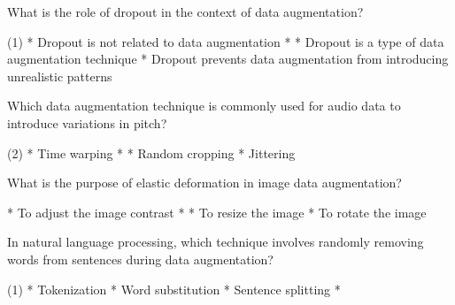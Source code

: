 \documentclass[10pt]{extarticle}
\begin{document}
\begin{exercise}
    What is the role of dropout in the context of data augmentation?
    \begin{choice} (1)
        * Dropout is not related to data augmentation
        * 
        * Dropout is a type of data augmentation technique
        * Dropout prevents data augmentation from introducing unrealistic patterns
    \end{choice}
\end{exercise}
\begin{solution}
\end{solution}

\begin{exercise}
    Which data augmentation technique is commonly used for audio data to introduce variations in pitch?
    \begin{choice} (2)
        * Time warping
        * 
        * Random cropping
        * Jittering
    \end{choice}
\end{exercise}
\begin{solution}
\end{solution}

\begin{exercise}
    What is the purpose of elastic deformation in image data augmentation?
    \begin{choice}
        * To adjust the image contrast
        * 
        * To resize the image
        * To rotate the image
    \end{choice}
\end{exercise}
\begin{solution}
\end{solution}

\begin{exercise}
    In natural language processing, which technique involves randomly removing words from sentences during data augmentation?
    \begin{choice} (1)
        * Tokenization
        * Word substitution
        * Sentence splitting
        * 
    \end{choice}
\end{exercise}
\begin{solution}
\end{solution}
\end{document}
